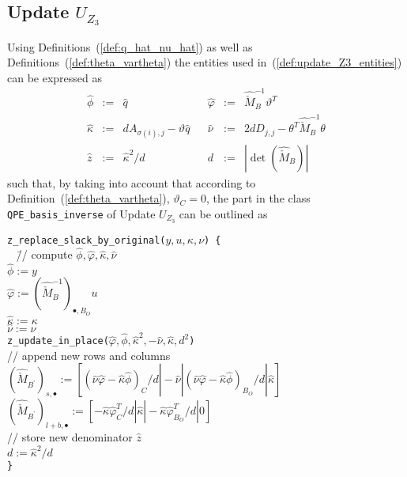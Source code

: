 \documentclass[a4paper]{article}
\begin{document}
\subsection{Update $U_{Z_{3}}$}
Using Definitions~(\ref{def:q_hat_nu_hat}) 
as well as Definitions~(\ref{def:theta_vartheta}) the entities used
in~(\ref{def:update_Z3_entities}) can be expressed as
\begin{equation}
\label{def:update_Z3_entities_prep}
\begin{array}{rclcrcl}
\hat{\phi} &:=& \hat{q}
&&
\hat{\varphi}
&:=&
\hat{\check{M}}_{B}^{-1}\vartheta^{T}
\\
\hat{\kappa} &:=& dA_{\sigma(i), j}-\vartheta\hat{q}
&&
\hat{\nu} &:=& 2dD_{j,j}-\theta^{T}\hat{\check{M}}_{B}^{-1}\theta
\\
\hat{z} &:=& \hat{\kappa}^{2}/d
&&
d &:=& \left|\det(\hat{\check{M}}_{B})\right|
\end{array}
\end{equation}
such that, by taking into account that according to
Definition~(\ref{def:theta_vartheta}), $\vartheta_{C}=0$,
the part in the class \texttt{QPE\_basis\_inverse} of
Update $U_{Z_{3}}$ can be outlined as
\begin{tabbing}
\texttt{z\_replace\_slack\_by\_original($y,u,\kappa,\nu$) \{}
\\
\texttt{  } \= // compute $\hat{\phi}, \hat{\varphi}, \hat{\kappa},
\hat{\nu}$ \\
\> \texttt{$\hat{\phi}:=y$} \\
\> \texttt{$\hat{\varphi}:= 
 \left(\hat{\check{M}}_{B}^{-1}\right)_{\bullet, B_{O}}u$} \\
\> \texttt{$\hat{\kappa}:=\kappa$} \\
\> \texttt{$\hat{\nu}:=\nu$} \\
\> \texttt{z\_update\_in\_place($\hat{\varphi}, \hat{\phi},
\hat{\kappa}^{2}, -\hat{\nu}, \hat{\kappa}, d^{2}$)} \\
\> // append new rows and columns \\
\> $\left(\hat{\check{M}}_{B^{\prime}}\right)_{s, \bullet}:=
\left[
  (\hat{\nu}\hat{\varphi}-\hat{\kappa}\hat{\phi})_{C}/d
  \left|\right. -\hat{\nu}
  \left|\right.(\hat{\nu}\hat{\varphi}-\hat{\kappa}\hat{\phi})_{B_{O}}/d 
  \left|\right. \hat{\kappa}
\right]$ \\
\> $\left(\hat{\check{M}}_{B^{\prime}}\right)_{l+b, \bullet}:=
\left[
  -\hat{\kappa}\hat{\varphi}^{T}_{C}/d
  \left|\right. \hat{\kappa}
  \left|\right. -\hat{\kappa}\hat{\varphi}^{T}_{B_{O}}/d
  \left|\right. 0
\right]$ \\
\> // store new denominator $\hat{z}$ \\
\> \texttt{$d:=\hat{\kappa}^{2}/d$} \\
\texttt{\}}
\end{tabbing}
\end{document}
